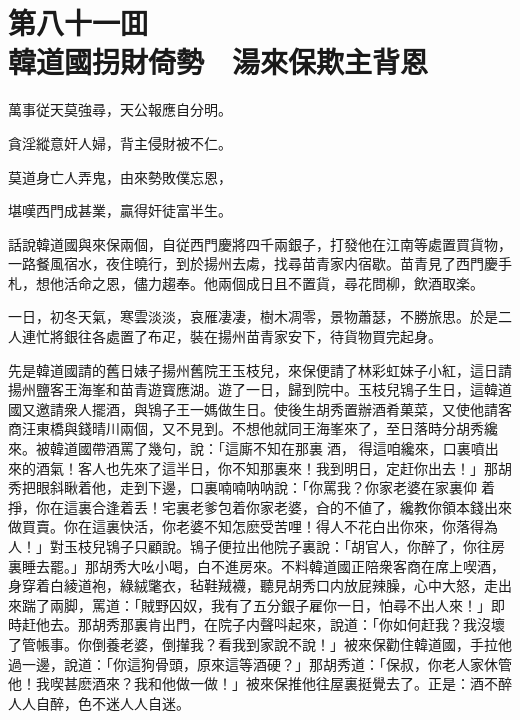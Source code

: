 
\chapter*{第八十一囬　\\韓道國拐財倚勢　湯來保欺主背恩}


\begin{myquote}
萬事従天莫強尋，天公報應自分明。

貪淫縱意奸人婦，背主侵財被不仁。

莫道身亡人弄鬼，由來勢敗僕忘恩，

堪嘆西門成甚業，贏得奸徒富半生。
\end{myquote}

話說韓道國與來保兩個，自従西門慶將四千兩銀子，打發他在江南等處置買貨物，一路餐風宿水，夜住曉行，到於揚州去䖏，找尋苗青家内宿歇。苗青見了西門慶手札，想他活命之恩，儘力趨奉。他兩個成日且不置貨，尋花問柳，飲酒取楽。

一日，初冬天氣，寒雲淡淡，哀雁凄凄，樹木凋零，景物蕭瑟，不勝旅思。於是二人連忙將銀往各處置了布疋，裝在揚州苗青家安下，待貨物買完起身。

先是韓道國請的舊日婊子揚州舊院王玉枝兒，來保便請了林彩虹妹子小紅，這日請揚州鹽客王海峯和苗青遊寳應湖。遊了一日，歸到院中。玉枝兒鴇子生日，這韓道國又邀請衆人擺酒，與鴇子王一媽做生日。使後生胡秀置辦酒肴菓菜，又使他請客商汪東橋與錢晴川兩個，又不見到。不想他就同王海峯來了，至日落時分胡秀纔來。被韓道國帶酒罵了幾句，說：「這廝不知在那裏𠳹酒，𠳹得這咱纔來，口裏噴出來的酒氣！客人也先來了這半日，你不知那裏來！我到明日，定赶你出去！」那胡秀把眼斜瞅着他，走到下邊，口裏喃喃呐呐說：「你罵我？你家老婆在家裏仰𢵞着掙，你在這裏合逢着丢！宅裏老爹包着你家老婆，㒲的不値了，纔教你領本錢出來做買賣。你在這裏快活，你老婆不知怎麽受苦哩！得人不花白出你來，你落得為人！」對玉枝兒鴇子只顧說。鴇子便拉出他院子裏說：「胡官人，你醉了，你往房裏睡去罷。」那胡秀大吆小喝，白不進房來。不料韓道國正陪衆客商在席上喫酒，身穿着白綾道袍，綠絨氅衣，毡鞋羢襪，聽見胡秀口内放屁辣臊，心中大怒，走出來踹了兩脚，罵道：「賊野囚奴，我有了五分銀子雇你一日，怕尋不出人來！」即時赶他去。那胡秀那裏肯出門，在院子内聲呌起來，說道：「你如何赶我？我沒壞了管帳事。你倒養老婆，倒攆我？看我到家說不說！」被來保勸住韓道國，手拉他過一邊，說道：「你這狗骨頭，原來這等酒硬？」那胡秀道：「保叔，你老人家休管他！我喫甚麽酒來？我和他做一做！」被來保推他往屋裏挺覺去了。正是：酒不醉人人自醉，色不迷人人自迷。

